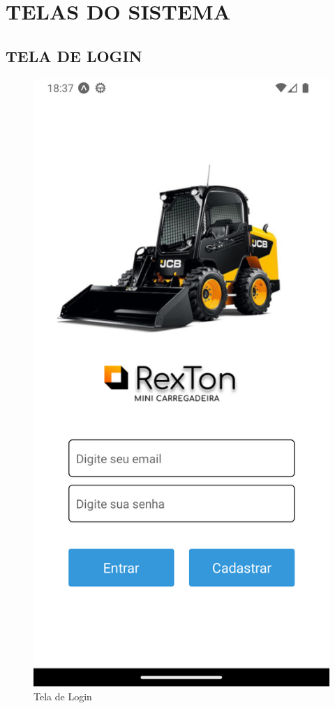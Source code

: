 \newpage
\section{TELAS DO SISTEMA}
\subsection{TELA DE LOGIN}
\begin{figure}[htb]
	\caption{\label{fig_diagrama-classes} Tela de Login}
	\begin{center}
	    \includegraphics[width=0.5\linewidth]{imagens/login.png}
	\end{center}
\end{figure}

\newpage

